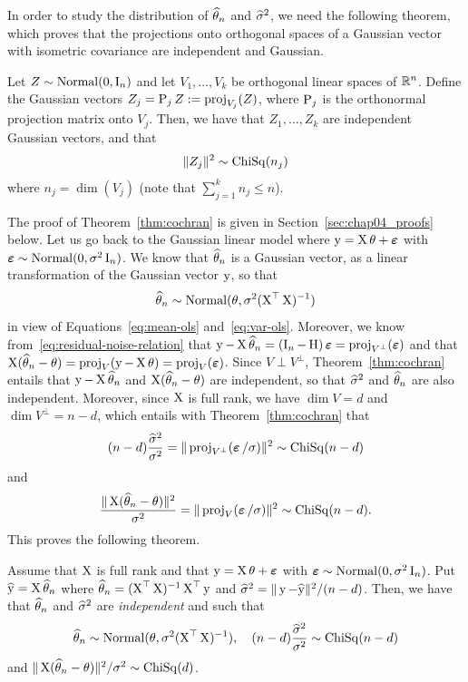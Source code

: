 In order to study the distribution of $\wh \theta_n$ and $\wh \sigma^2$, we need the following theorem, which proves that the projections onto orthogonal spaces of a Gaussian vector with isometric covariance are independent and Gaussian.
\begin{theorem}
	\label{thm:cochran}
	Let $Z \sim \nor(0, \bI_n)$ and let $V_1, \ldots, V_k$ be orthogonal linear spaces of $\R^n$. Define the Gaussian vectors $Z_j = \bP_j Z := \proj_{V_j}(Z)$, where $\bP_j$ is the orthonormal projection matrix onto $V_j$. Then, we have that $Z_1, \ldots, Z_k$ are independent Gaussian vectors, and that
	\begin{equation}
		\norm{Z_j}^2 \sim \chisq(n_j)
	\end{equation}
	where $n_j = \dim(V_j)$ (note that $\sum_{j=1}^k n_j \leq n$).
\end{theorem}
The proof of Theorem~\ref{thm:cochran} is given in Section~\ref{sec:chap04_proofs} below.
Let us go back to the Gaussian linear model where $\by = \bX \theta + \beps$ with $\beps \sim \nor(0, \sigma^2 \bI_n)$.
We know that $\wh \theta_n$ is a Gaussian vector, as a linear transformation of the Gaussian vector $\by$, so that
\begin{equation*}
	\wh \theta_n \sim \nor(\theta, \sigma^2 (\bX^\top \bX)^{-1})
\end{equation*}
in view of Equations~\eqref{eq:mean-ols} and~\eqref{eq:var-ols}.
Moreover, we know from~\eqref{eq:residual-noise-relation} that $\by - \bX \wh \theta_n = (\bI_n - \bH) \beps = \proj_{V^\perp}(\beps)$ and that $\bX (\wh \theta_n - \theta) = \proj_V(\by - \bX \theta) = \proj_V(\beps)$.
Since $V \perp V^\perp$, Theorem~\ref{thm:cochran} entails that $\by - \bX \wh \theta_n$ and $\bX (\wh \theta_n - \theta)$ are independent, so that $\wh \sigma^2$ and $\wh \theta_n$ are also independent.
Moreover, since $\bX$ is full rank, we have $\dim V = d$ and $\dim V^\perp = n - d$, which entails with Theorem~\ref{thm:cochran} that
\begin{equation*}
	(n - d) \frac{\wh \sigma^2}{\sigma^2} = \norm{\proj_{V^\perp}(\beps / \sigma)}^2 \sim \chisq(n-d)
\end{equation*}
and
\begin{equation*}
	\frac{\norm{\bX(\wh \theta_n - \theta)}^2}{\sigma^2 } = \norm{\proj_{V}(\beps / \sigma)}^2 \sim \chisq(n-d).
\end{equation*}
This proves the following theorem.
\begin{theorem}
	\label{thm:gaussian-ols-distribution}
	Assume that $\bX$ is full rank and that $\by = \bX \theta + \beps$ with $\beps \sim \nor(0, \sigma^2 \bI_n)$. Put $\wh \by = \bX \wh \theta_n$ where $\wh \theta_n = (\bX^\top \bX)^{-1} \bX^\top \by$  and $\wh \sigma^2 = \norm{\by - \wh \by}^2 / (n-d)$. 
	Then, we have that $\wh \theta_n$ and $\wh \sigma^2$ are \emph{independent} and such that
	\begin{equation*}
		\wh \theta_n \sim \nor(\theta, \sigma^2 (\bX^\top \bX)^{-1}), \quad (n-d) \frac{\wh \sigma^2}{\sigma^2} \sim \chisq(n - d)
	\end{equation*}
	and $\norm{\bX(\wh \theta_n - \theta)}^2 / \sigma^2 \sim \chisq(d)$.
\end{theorem}

